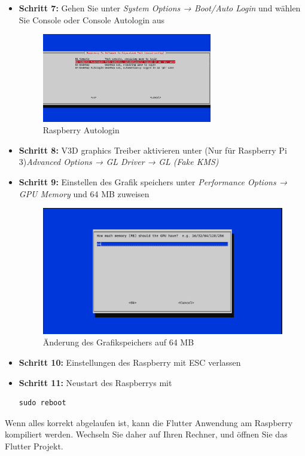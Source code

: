 \begin{itemize}
\item {\textbf{Schritt 7:}} Gehen Sie unter {\textit{System Options → Boot/Auto Login}} und w\"ahlen Sie Console oder Console Autologin aus
\begin{figure}[!h]
        \centering
        \includegraphics[width=0.7\textwidth]{FLUTTER/images/GP/raspberry_autologin.png}
        \caption{Raspberry Autologin}
        \end{figure}
    
\item {\textbf{Schritt 8:}} V3D graphics Treiber aktivieren unter (Nur für Raspberry Pi 3){\textit{Advanced Options → GL Driver → GL (Fake KMS)}}
\newpage

\newpage

\item {\textbf{Schritt 9:} Einstellen des Grafik speichers unter \textit{Performance Options → GPU Memory} und 64 MB zuweisen}
\begin{figure}[!h]
        \vspace{0.5cm}
        \centering
        \includegraphics[width=1\textwidth]{FLUTTER/images/GP/raspberry_gpumemory.png}
        \caption{Änderung des Grafikspeichers auf 64 MB}
        \end{figure}
\item {\textbf{Schritt 10:}} Einstellungen des Raspberry mit ESC verlassen
\item {\textbf{Schritt 11:}} Neustart des Raspberrys mit 
\begin{lstlisting}[style=flutterListingStyle,caption=Neustart]
sudo reboot
\end{lstlisting}
\end{itemize}
Wenn alles korrekt abgelaufen ist, kann die Flutter Anwendung am Raspberry kompiliert werden. Wechseln Sie daher auf Ihren Rechner, und öffnen Sie das Flutter Projekt.\\


